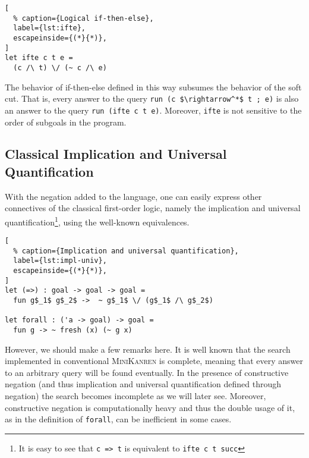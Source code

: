 \begin{minipage}[h]{\textwidth}
\begin{lstlisting}[
  % caption={Logical if-then-else},
  label={lst:ifte},
  escapeinside={(*}{*)},
]
let ifte c t e = 
  (c /\ t) \/ (~ c /\ e)
\end{lstlisting}
\end{minipage}

The behavior of if-then-else defined in this way
subsumes the behavior of the soft cut.
That is, every answer to the query \lstinline{run (c $\rightarrow^*$ t ; e)}
is also an answer to the query \lstinline{run (ifte c t e)}.
Moreover, \lstinline{ifte} is not sensitive to the order
of subgoals in the program.

\subsection{Classical Implication and Universal Quantification}

\label{sec:impl-univ}

With the negation added to the language, one can easily express other 
connectives of the classical first-order logic,
namely the implication and universal quantification\footnote{
It is easy to see that \lstinline[mathescape]{c => t} 
is equivalent to \lstinline{ifte c t succ}},
using the well-known equivalences.

\begin{minipage}[h]{\textwidth}
\begin{lstlisting}[
  % caption={Implication and universal quantification},
  label={lst:impl-univ},
  escapeinside={(*}{*)},
]
let (=>) : goal -> goal -> goal = 
  fun g$_1$ g$_2$ ->  ~ g$_1$ \/ (g$_1$ /\ g$_2$)

let forall : ('a -> goal) -> goal = 
  fun g -> ~ fresh (x) (~ g x)
\end{lstlisting}
\end{minipage}


However, we should make a few remarks here.
It is well known that the search implemented 
in conventional \textsc{MiniKanren} is complete, 
meaning that every answer to an arbitrary query 
will be found eventually. 
In the presence of constructive negation 
(and thus implication and universal quantification defined through negation)
the search becomes incomplete as we will later see.
Moreover, constructive negation is computationally heavy
and thus the double usage of it,
as in the definition of \lstinline{forall},
can be inefficient in some cases.

